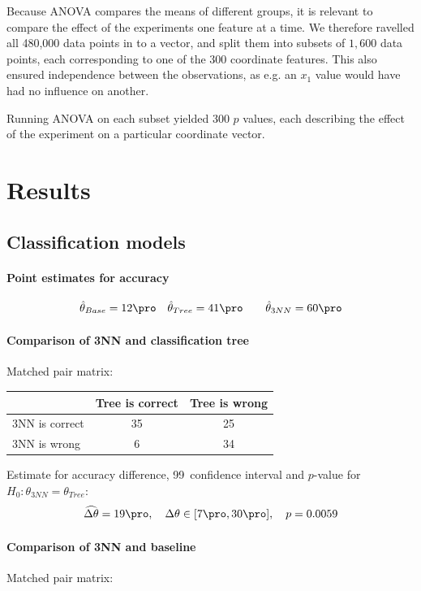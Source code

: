 \documentclass[11pt,fleqn]{article}
\begin{document}
Because ANOVA compares the means of different groups, it is relevant to compare the effect of the experiments one feature at a time.
We therefore ravelled all 480,000 data points in to a vector, and split them into subsets of $ 1,600 $ data points, each corresponding to one of the $ 300 $ coordinate features.
This also ensured independence between the observations, as e.g. an $ x_1 $ value would have had no influence on another.

Running ANOVA on each subset yielded 300 $ p $ values, each describing the effect of the experiment on a particular coordinate vector. 


\section{Results}

\subsection{Classification models}

\paragraph{Point estimates for accuracy}

\begin{align*}
	& \hat \theta_{Base}= 12\pro 
	&& \hat \theta_{Tree} =41\pro 
	&&&\hat \theta_{3NN} = 60 \pro 
\end{align*}
\paragraph{Comparison of 3NN and classification tree}
Matched pair matrix:

\begin{table}[H]
	\centering
	\begin{tabular}{l|c c}
		&Tree is correct& Tree is wrong \\
		\hline
		3NN is correct &35& 25\\
		3NN is wrong& 6& 34
	\end{tabular}
\end{table}\noindent 
Estimate for accuracy difference, 99\pro\ confidence interval and \(p\)-value for \(H_0: \theta_{3NN}=\theta_{Tree}\):
\[
\widehat{\Delta \theta} = 19\pro,\quad  \Delta \theta\in[7\pro , 30\pro], \quad p = 0.0059 
\]

\paragraph{Comparison of 3NN and baseline}
Matched pair matrix:
\end{document}
